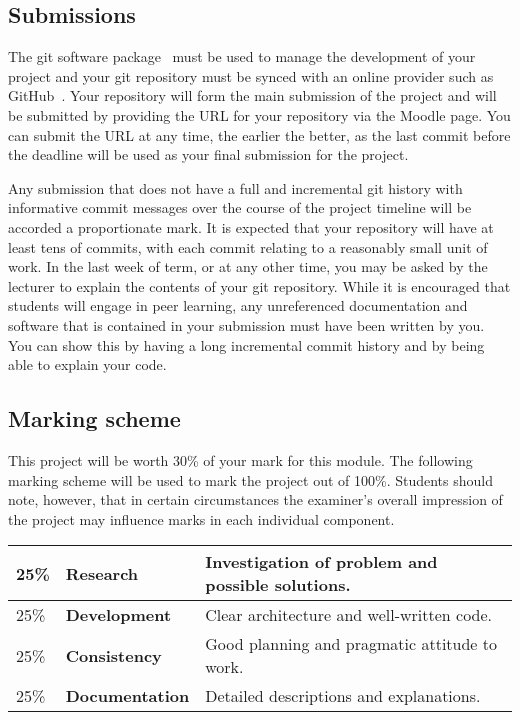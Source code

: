 \documentclass[12pt, a4paper]{article}
\begin{document}
\subsection*{Submissions}
The git software package~\cite{git} must be used to manage the development of your project and your git repository must be synced with an online provider such as GitHub~\cite{github}.
Your repository will form the main submission of the project and will be submitted by providing the URL for your repository via the Moodle page.
You can submit the URL at any time, the earlier the better, as the last commit before the deadline will be used as your final submission for the project.

Any submission that does not have a full and incremental git history with informative commit messages over the course of the project timeline will be accorded a proportionate mark.
It is expected that your repository will have at least tens of commits, with each commit relating to a reasonably small unit of work.
In the last week of term, or at any other time, you may be asked by the lecturer to explain the contents of your git repository.
While it is encouraged that students will engage in peer learning, any unreferenced documentation and software that is contained in your submission must have been written by you.
You can show this by having a long incremental commit history and by being able to explain your code.


\subsection*{Marking scheme}
This project will be worth 30\% of your mark for this module.
The following marking scheme will be used to mark the project out of 100\%.
Students should note, however, that in certain circumstances the examiner's overall impression of the project may influence marks in each individual component.

\begin{center}
  \begin{tabular}{llp{8.4cm}}
    \toprule
    25\% & \textbf{Research} & Investigation of problem and possible solutions. \\
    \midrule
    25\% & \textbf{Development} & Clear architecture and well-written code. \\
    \midrule
    25\% & \textbf{Consistency} & Good planning and pragmatic attitude to work. \\
    \midrule
    25\% & \textbf{Documentation} & Detailed descriptions and explanations. \\
    \bottomrule
  \end{tabular}
\end{center}
\end{document}

